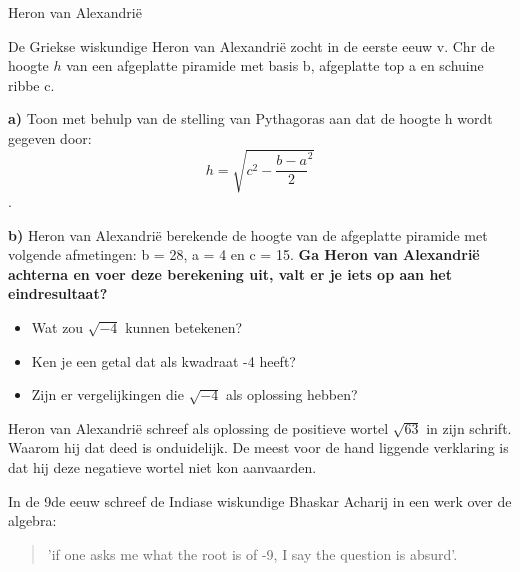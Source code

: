 \documentclass{ximera}
\begin{document}

\begin{exercise}{Heron van Alexandrië}

    De Griekse wiskundige Heron van Alexandrië zocht in de eerste eeuw v. Chr de hoogte \(h\) van een afgeplatte piramide met basis b, afgeplatte top a en schuine ribbe c. 

    \textbf{a)} 
    Toon met behulp van de stelling van Pythagoras aan dat de hoogte h wordt gegeven door: \[h = \sqrt{c^2 - {\frac{b-a}{2}}^2}\]. 

    \textbf{b)} 
    Heron van Alexandrië berekende de hoogte van de afgeplatte piramide met volgende afmetingen: b = 28, a = 4 en c = 15. 
    \textbf{Ga Heron van Alexandrië achterna en voer deze berekening uit, valt er je iets op aan het eindresultaat? }

\end{exercise}



\begin{denkvraag*}{}
\begin{itemize}
    \item Wat zou \(\sqrt{-4}\) kunnen betekenen? 
    \item Ken je een getal dat als kwadraat -4 heeft? 
    \item Zijn er vergelijkingen die \(\sqrt{-4}\) als oplossing hebben? 
\end{itemize}
\end{denkvraag*}

Heron van Alexandrië schreef als oplossing de positieve wortel \(\sqrt{63}\) in zijn schrift. 
Waarom hij dat deed is onduidelijk.
De meest voor de hand liggende verklaring is dat hij deze negatieve wortel niet kon aanvaarden. 

In de 9de eeuw schreef de Indiase wiskundige Bhaskar Acharij in een werk over de algebra: 

\begin{quote}
    'if one asks me what the root is of -9, I say the question is absurd'. 
\end{quote}


\end{document}
